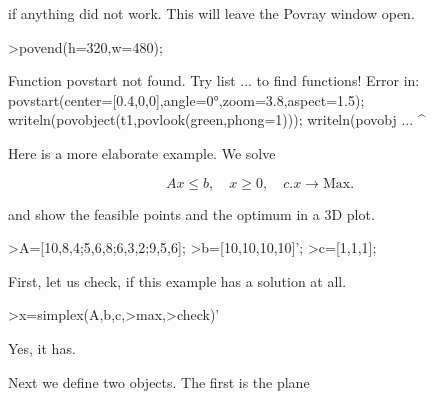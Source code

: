 \documentclass[a4paper,10pt]{article}
\begin{document}
\begin{eulernotebook}
\begin{eulercomment}
if anything did not work. This will leave the Povray window open.
\end{eulercomment}
\begin{eulerprompt}
>povend(h=320,w=480);
\end{eulerprompt}
\begin{euleroutput}
  Function povstart not found.
  Try list ... to find functions!
  Error in:
  povstart(center=[0.4,0,0],angle=0°,zoom=3.8,aspect=1.5); writeln(povobject(t1,povlook(green,phong=1))); writeln(povobj ...
                                                         ^
\end{euleroutput}
\begin{eulercomment}
Here is a more elaborate example. We solve

\end{eulercomment}
\begin{eulerformula}
\[
Ax \le b, \quad x \ge 0, \quad c.x \to \text{Max.}
\]
\end{eulerformula}
\begin{eulercomment}
and show the feasible points and the optimum in a 3D plot.
\end{eulercomment}
\begin{eulerprompt}
>A=[10,8,4;5,6,8;6,3,2;9,5,6];
>b=[10,10,10,10]';
>c=[1,1,1];
\end{eulerprompt}
\begin{eulercomment}
First, let us check, if this example has a solution at all.
\end{eulercomment}
\begin{eulerprompt}
>x=simplex(A,b,c,>max,>check)'
\end{eulerprompt}
\begin{euleroutput}
  [0,  1,  0.5]
\end{euleroutput}
\begin{eulercomment}
Yes, it has.

Next we define two objects. The first is the plane


\end{eulercomment}
\end{eulernotebook}
\end{document}
